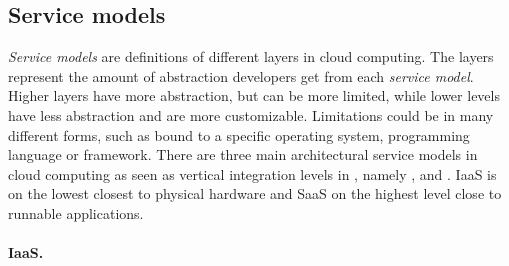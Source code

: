\subsection{Service models}


\emph{Service models} are definitions of different layers in cloud computing.
The layers represent the amount of abstraction developers get from each \emph{service model}.
Higher layers have more abstraction, but can be more limited, while lower levels 
have less abstraction and are more customizable.
Limitations could be in many different forms, such as bound to a specific operating system,
programming language or framework.
There are three main architectural service models in cloud computing\cite{nist:mell11}
as seen as vertical integration levels in ,
namely ,  and .
IaaS is on the lowest closest to physical hardware and SaaS on the highest
level close to runnable applications.

\paragraph{IaaS.}

